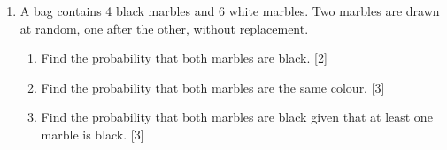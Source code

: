 \documentclass[12pt, twoside]{article}
\begin{document}
\begin{enumerate}[itemsep=0.1cm]
\newpage
\item A bag contains 4 black marbles and 6 white marbles. Two marbles are
drawn at random, one after the other, without replacement.

\begin{enumerate}[itemsep=0.1cm]
  \item Find the probability that both marbles are black. \hfill [2]
  \item Find the probability that both marbles are the same colour. \hfill [3]
  \item Find the probability that both marbles are black given that
        at least one marble is black. \hfill [3]
\end{enumerate}


\end{enumerate}
\end{document}
